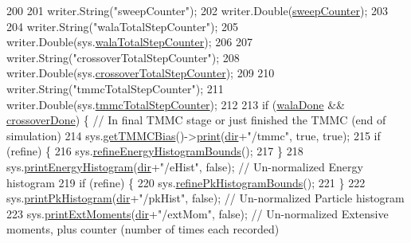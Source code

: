 \begin{DoxyCode}
200 
201     writer.String(\textcolor{stringliteral}{"sweepCounter"});
202     writer.Double(\hyperlink{classcheckpoint_ad011ddbca1ea708321335b1b3ac67e07}{sweepCounter});
203 
204     writer.String(\textcolor{stringliteral}{"walaTotalStepCounter"});
205     writer.Double(sys.\hyperlink{classsim_system_a46f5d3a8843821b45fd3f4d9234a177f}{walaTotalStepCounter});
206 
207     writer.String(\textcolor{stringliteral}{"crossoverTotalStepCounter"});
208     writer.Double(sys.\hyperlink{classsim_system_a1d71d1df76bba70136853e30823d2db9}{crossoverTotalStepCounter});
209 
210     writer.String(\textcolor{stringliteral}{"tmmcTotalStepCounter"});
211     writer.Double(sys.\hyperlink{classsim_system_a3ca5ff86766ab388bfd7a48605b10e17}{tmmcTotalStepCounter});
212 
213     \textcolor{keywordflow}{if} (\hyperlink{classcheckpoint_aab066479e2ca6656d0031dd46a2fc1a5}{walaDone} && \hyperlink{classcheckpoint_a4f13612ea6d376bb327295bfce3a70c5}{crossoverDone}) \{ \textcolor{comment}{// In final TMMC stage or just finished the TMMC
       (end of simulation)}
214         sys.\hyperlink{classsim_system_aa31d40c91cb50f143a9613d362798887}{getTMMCBias}()->\hyperlink{classtmmc_ad49e147dc88b3e1c2975269598f94327}{print}(\hyperlink{classcheckpoint_a0e0f999ee8e0b09541e9131baa8a591d}{dir}+\textcolor{stringliteral}{"/tmmc"}, \textcolor{keyword}{true}, \textcolor{keyword}{true});
215         \textcolor{keywordflow}{if} (refine) \{
216             sys.\hyperlink{classsim_system_afe05cba714a032b445cfb1a529547833}{refineEnergyHistogramBounds}();
217         \}
218         sys.\hyperlink{classsim_system_a6ef1ba3e08ec44d865436e272cdebc9b}{printEnergyHistogram}(\hyperlink{classcheckpoint_a0e0f999ee8e0b09541e9131baa8a591d}{dir}+\textcolor{stringliteral}{"/eHist"}, \textcolor{keyword}{false}); \textcolor{comment}{// Un-normalized Energy
       histogram}
219         \textcolor{keywordflow}{if} (refine) \{
220             sys.\hyperlink{classsim_system_a1e462fcb63389d59419ff6135b2d802e}{refinePkHistogramBounds}();
221         \}
222         sys.\hyperlink{classsim_system_ac29bdd6f7fa6f9526b7eafcf658d70d8}{printPkHistogram}(\hyperlink{classcheckpoint_a0e0f999ee8e0b09541e9131baa8a591d}{dir}+\textcolor{stringliteral}{"/pkHist"}, \textcolor{keyword}{false}); \textcolor{comment}{// Un-normalized Particle histogram}
223         sys.\hyperlink{classsim_system_a2818b2f0ff79782d5443ca0f191564f8}{printExtMoments}(\hyperlink{classcheckpoint_a0e0f999ee8e0b09541e9131baa8a591d}{dir}+\textcolor{stringliteral}{"/extMom"}, \textcolor{keyword}{false}); \textcolor{comment}{// Un-normalized Extensive moments,
       plus counter (number of times each recorded)}

\end{DoxyCode}
